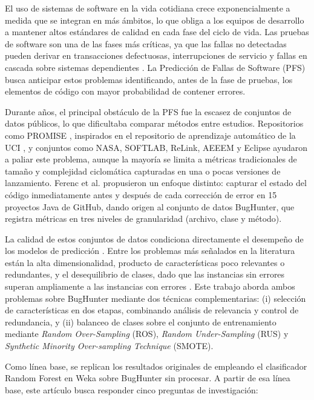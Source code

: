 \documentclass[conference,a4paper]{IEEEtran}
\begin{document}
El uso de sistemas de software en la vida cotidiana crece exponencialmente a medida que se integran en más ámbitos, lo que obliga a los equipos de desarrollo a mantener altos estándares de calidad en cada fase del ciclo de vida. Las pruebas de software son una de las fases más críticas, ya que las fallas no detectadas pueden derivar en transacciones defectuosas, interrupciones de servicio y fallas en cascada sobre sistemas dependientes \cite{singh2024,ferenc2020}. La Predicción de Fallas de Software (PFS) busca anticipar estos problemas identificando, antes de la fase de pruebas, los elementos de código con mayor probabilidad de contener errores.

Durante años, el principal obstáculo de la PFS fue la escasez de conjuntos de datos públicos, lo que dificultaba comparar métodos entre estudios. Repositorios como PROMISE \cite{promise2005}, inspirados en el repositorio de aprendizaje automático de la UCI \cite{uci1987}, y conjuntos como NASA, SOFTLAB, ReLink, AEEEM y Eclipse ayudaron a paliar este problema, aunque la mayoría se limita a métricas tradicionales de tamaño y complejidad ciclomática capturadas en una o pocas versiones de lanzamiento. Ferenc et al. \cite{ferenc2020} propusieron un enfoque distinto: capturar el estado del código inmediatamente antes y después de cada corrección de error en 15 proyectos Java de GitHub, dando origen al conjunto de datos BugHunter, que registra métricas en tres niveles de granularidad (archivo, clase y método).

La calidad de estos conjuntos de datos condiciona directamente el desempeño de los modelos de predicción \cite{rathi2023}. Entre los problemas más señalados en la literatura están la alta dimensionalidad, producto de características poco relevantes o redundantes, y el desequilibrio de clases, dado que las instancias sin errores superan ampliamente a las instancias con errores \cite{tantithamthavorn2020}. Este trabajo aborda ambos problemas sobre BugHunter mediante dos técnicas complementarias: (i) selección de características en dos etapas, combinando análisis de relevancia y control de redundancia, y (ii) balanceo de clases sobre el conjunto de entrenamiento mediante \textit{Random Over-Sampling} (ROS), \textit{Random Under-Sampling} (RUS) y \textit{Synthetic Minority Over-sampling Technique} (SMOTE).

Como línea base, se replican los resultados originales de \cite{ferenc2020} empleando el clasificador Random Forest en Weka sobre BugHunter sin procesar. A partir de esa línea base, este artículo busca responder cinco preguntas de investigación:
\end{document}
